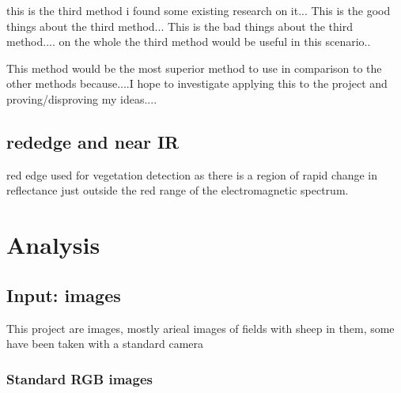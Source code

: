 this is the third method i found some existing research on it...
This is the good things about the third method...
This is the bad things about the third  method....
on the whole the third method would be useful in this scenario..

This method would be the most superior method to use in comparison to the other methods because....I hope to investigate applying this to the project and proving/disproving my ideas....

\subsection{rededge and near IR}

red edge used for vegetation detection as there is a region of rapid change in reflectance just outside the red range of the electromagnetic spectrum.


\section{Analysis}
\begin{comment}
Taking into account the problem and what you learned from the background work, what was your analysis of the problem? How did your analysis help to decompose the problem into the main tasks that you would undertake? Were there alternative approaches? Why did you choose one approach compared to the alternatives? 

There should be a clear statement of the research questions, which you will evaluate at the end of the work. 

In most cases, the agreed objectives or requirements will be the result of a compromise between what would ideally have been produced and what was felt to be possible in the time available. A discussion of the process of arriving at the final list is usually appropriate.
\end{comment}

\subsection{Input: images}
This project are images, mostly arieal images of fields with sheep in them, some have been taken with a standard camera 
\subsubsection{Standard RGB images}

